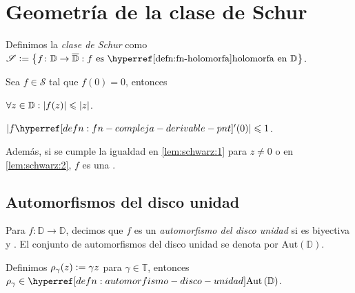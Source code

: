 \chapter{Geometría de la clase de Schur}\label{chap1}

\begin{defn}\label{defn:clase-schur}
    Definimos la \textit{clase de Schur} como $\mathscr{S} \defeq \left\{ f \colon \mathbb{D} \to \bar{\mathbb{D}} : f \text{ es \exhyperref[defn:fn-holomorfa]{fn-holomorfa}{holomorfa} en } \mathbb{D}  \right\}$.
\end{defn}

\begin{lem}[de Schwarz]\label{lem:schwarz}
    Sea $f \in \mathscr{S}$ tal que $f(0) = 0$, entonces
    \begin{enu}[2][label=\textnormal{(\arabic*)}, ref=\textnormal{(\arabic*)}]
        \item\label{lem:schwarz:1} $\forall z \in \mathbb{D} : \left|f(z)\right| \leqslant \left|z\right|$.
        \item\label{lem:schwarz:2} $\abs{f\exhyperref[defn:fn-compleja-derivable-pnt]{fn-compleja-derivable-pnt}{'}(0)} \leq 1$.
    \end{enu}

    Además, si se cumple la igualdad en \ref{lem:schwarz:1} para $z \neq 0$ o en \ref{lem:schwarz:2}, $f$ es una .
\end{lem}

\section{Automorfismos del disco unidad}

\begin{defn}\label{defn:automorfismo-disco-unidad}
    Para $f \colon \mathbb{D} \to \mathbb{D}$, decimos que $f$ es un \emph{automorfismo del disco unidad} si es biyectiva y . El conjunto de automorfismos del disco unidad se denota por $\mathrm{Aut} \left(\mathbb{D} \right)$.
\end{defn}

\begin{ejem}[Rotación]\label{ejem:rotacion-disco-unidad}
    Definimos $\rho_\gamma(z) \vcentcolon= \gamma z$ para $\gamma \in \mathbb{T}$, entonces $\rho_\gamma \in \exhyperref[defn:automorfismo-disco-unidad]{automorfismo-disco-unidad}{\mathrm{Aut} \left(\mathbb{D}\right)}$.
\end{ejem}

